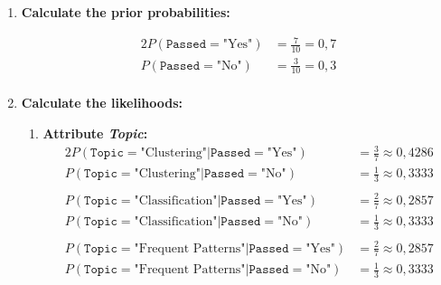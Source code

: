 \documentclass[
english,
smallborders
]{i6prcsht}
\newcommand{\PriorProbability}[2]{P(\texttt{#1}=\text{"#2"})}
\newcommand{\Likelihood}[4]{P(\texttt{#1}=\text{"#2"} | \texttt{#3}=\text{"#4"})}
\begin{document}
\begin{solution}
	\begin{enumerate}
		\item \textbf{Calculate the prior probabilities:}

		      \begin{alignat*}{2}
			      \PriorProbability{Passed}{Yes} & = \frac{7}{10} = 0,7 \\
			      \PriorProbability{Passed}{No}  & = \frac{3}{10} = 0,3 \\
		      \end{alignat*}

		\item \textbf{Calculate the likelihoods:}

		      \begin{enumerate}
			      \item \textbf{Attribute \textit{Topic}:}
			            \begin{alignat*}{2}
				            \Likelihood{Topic}{Clustering}{Passed}{Yes}        & = \frac{3}{7} \approx 0,4286 \\
				            \Likelihood{Topic}{Clustering}{Passed}{No}         & = \frac{1}{3} \approx 0,3333 \\
				                                                               &                              \\
				            \Likelihood{Topic}{Classification}{Passed}{Yes}    & = \frac{2}{7} \approx 0,2857 \\
				            \Likelihood{Topic}{Classification}{Passed}{No}     & = \frac{1}{3} \approx 0,3333 \\
				                                                               &                              \\
				            \Likelihood{Topic}{Frequent Patterns}{Passed}{Yes} & = \frac{2}{7} \approx 0,2857 \\
				            \Likelihood{Topic}{Frequent Patterns}{Passed}{No}  & = \frac{1}{3} \approx 0,3333 \\
			            \end{alignat*}


\end{enumerate}
\end{enumerate}
\end{solution}
\end{document}

